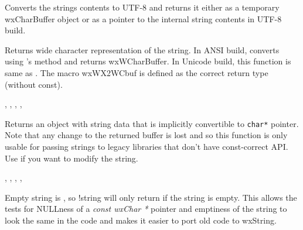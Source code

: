 \label{wxstringutf8str}



Converts the strings contents to UTF-8 and returns it either as a temporary
wxCharBuffer object or as a pointer to the internal string contents in
UTF-8 build.


\label{wxstringwcstr}



Returns wide character representation of the string.
In ANSI build, converts using 's 
method and returns wxWCharBuffer. In Unicode build, this function is same
as .
The macro wxWX2WCbuf is defined as the correct return type (without const).


,
, ,
, 

\label{wxstringwcharstr}


Returns an object with string data that is implicitly convertible to
{\tt char*} pointer. Note that any change to the returned buffer is lost and so
this function is only usable for passing strings to legacy libraries that
don't have const-correct API. Use  if
you want to modify the string.


, ,
, ,


\label{wxstringoperatornot}


Empty string is \false, so !string will only return \true if the string is empty.
This allows the tests for NULLness of a {\it const wxChar *} pointer and emptiness
of the string to look the same in the code and makes it easier to port old code
to wxString.

